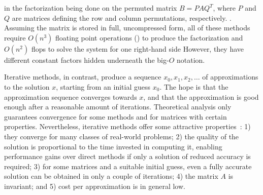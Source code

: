 in the factorization being done on the permuted matrix $B = P A Q^T$, where $P$
and $Q$ are matrices defining the row and column permutations, respectively.
.
Assuming the matrix is stored in full, uncompressed form, all of these methods
require $O(n^3)$ floating point operations () to produce the
factorization and $O(n^2)$ flops to solve the system for one right-hand side
However, they have different constant factors hidden underneath the big-$O$
notation.

Iterative methods, in contrast, produce a sequence $x_0, x_1, x_2, \ldots$ of
approximations to the solution $x$, starting from an initial guess $x_0$. The
hope is that the approximation sequence converges towards $x$, and that the
approximation is
good enough after a reasonable amount of iterations. Theoretical analysis only
guarantees convergence for some methods and for matrices with certain
properties. Nevertheless, iterative methods offer some attractive
properties~\cite{saad}: 1) they converge for many classes of real-world
problems; 2) the quality of the solution is proportional to the time
invested in computing it, enabling performance gains over direct methods if only
a solution of reduced accuracy is required; 3) for some matrices and a
suitable initial guess, even a fully accurate solution can be obtained in only a
couple of iterations; 4) the matrix $A$ is invariant; and 5) cost per
approximation is in general low.

